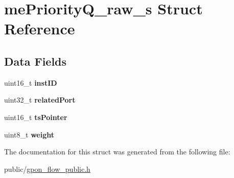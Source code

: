 \hypertarget{structmePriorityQ__raw__s}{}\section{me\+Priority\+Q\+\_\+raw\+\_\+s Struct Reference}
\label{structmePriorityQ__raw__s}
\subsection*{Data Fields}
\begin{DoxyCompactItemize}
\item 
\mbox{\label{structmePriorityQ__raw__s_a38a3a461f3f5551912fc4045df73e254}} 
uint16\+\_\+t {\bfseries inst\+ID}
\item 
\mbox{\label{structmePriorityQ__raw__s_a1443936bf9336afd5b4672f12ddeef9d}} 
uint32\+\_\+t {\bfseries related\+Port}
\item 
\mbox{\label{structmePriorityQ__raw__s_ae6fc0cae6aa6245ad35262a6339aede1}} 
uint16\+\_\+t {\bfseries ts\+Pointer}
\item 
\mbox{\label{structmePriorityQ__raw__s_a6bc10ee71eddafd788c2168786de07db}} 
uint8\+\_\+t {\bfseries weight}
\end{DoxyCompactItemize}


The documentation for this struct was generated from the following file\+:\begin{DoxyCompactItemize}
\item 
public/\hyperlink{gpon__flow__public_8h}{gpon\+\_\+flow\+\_\+public.\+h}\end{DoxyCompactItemize}
